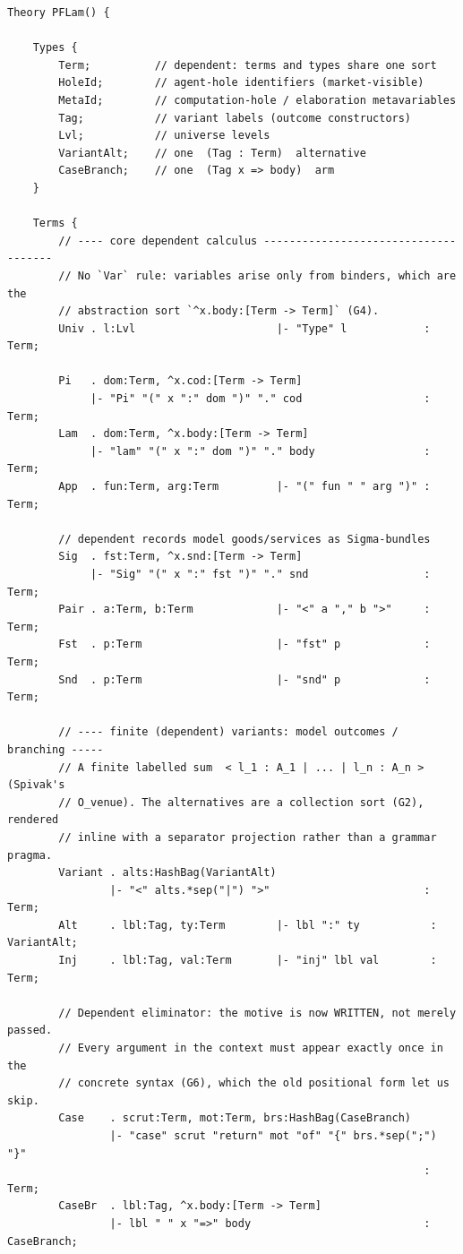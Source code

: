 \documentclass[11pt]{article}
\begin{document}
\begin{lstlisting}[language=mettail]
Theory PFLam() {

    Types {
        Term;          // dependent: terms and types share one sort
        HoleId;        // agent-hole identifiers (market-visible)
        MetaId;        // computation-hole / elaboration metavariables
        Tag;           // variant labels (outcome constructors)
        Lvl;           // universe levels
        VariantAlt;    // one  (Tag : Term)  alternative
        CaseBranch;    // one  (Tag x => body)  arm
    }

    Terms {
        // ---- core dependent calculus -------------------------------------
        // No `Var` rule: variables arise only from binders, which are the
        // abstraction sort `^x.body:[Term -> Term]` (G4).
        Univ . l:Lvl                      |- "Type" l            : Term;

        Pi   . dom:Term, ^x.cod:[Term -> Term]
             |- "Pi" "(" x ":" dom ")" "." cod                   : Term;
        Lam  . dom:Term, ^x.body:[Term -> Term]
             |- "lam" "(" x ":" dom ")" "." body                 : Term;
        App  . fun:Term, arg:Term         |- "(" fun " " arg ")" : Term;

        // dependent records model goods/services as Sigma-bundles
        Sig  . fst:Term, ^x.snd:[Term -> Term]
             |- "Sig" "(" x ":" fst ")" "." snd                  : Term;
        Pair . a:Term, b:Term             |- "<" a "," b ">"     : Term;
        Fst  . p:Term                     |- "fst" p             : Term;
        Snd  . p:Term                     |- "snd" p             : Term;

        // ---- finite (dependent) variants: model outcomes / branching -----
        // A finite labelled sum  < l_1 : A_1 | ... | l_n : A_n >  (Spivak's
        // O_venue). The alternatives are a collection sort (G2), rendered
        // inline with a separator projection rather than a grammar pragma.
        Variant . alts:HashBag(VariantAlt)
                |- "<" alts.*sep("|") ">"                        : Term;
        Alt     . lbl:Tag, ty:Term        |- lbl ":" ty           : VariantAlt;
        Inj     . lbl:Tag, val:Term       |- "inj" lbl val        : Term;

        // Dependent eliminator: the motive is now WRITTEN, not merely passed.
        // Every argument in the context must appear exactly once in the
        // concrete syntax (G6), which the old positional form let us skip.
        Case    . scrut:Term, mot:Term, brs:HashBag(CaseBranch)
                |- "case" scrut "return" mot "of" "{" brs.*sep(";") "}"
                                                                 : Term;
        CaseBr  . lbl:Tag, ^x.body:[Term -> Term]
                |- lbl " " x "=>" body                           : CaseBranch;


\end{lstlisting}
\end{document}
